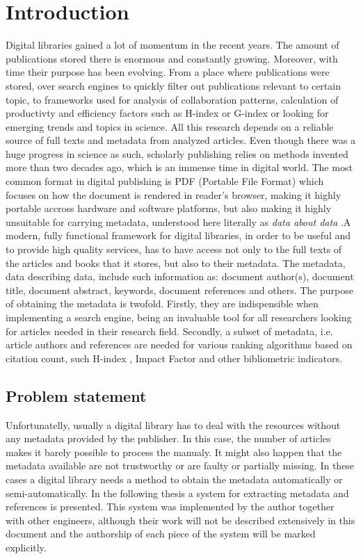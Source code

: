 \chapter{Introduction}
Digital libraries gained a lot of momentum in the recent years. The amount of publications stored there is enormous and constantly growing. Moreover, with time their purpose has been evolving. From a place where publications were stored, over search engines to quickly filter out publications relevant to certain topic, to frameworks used for analysis of collaboration patterns, calculation of productivty and efficiency factors such as H-index or G-index or looking for emerging trends and topics in science. All this research depends on a reliable source of full texts and metadata from analyzed articles.
Even though there was a huge progress in science as such, scholarly publishing relies on methods invented more than two decades ago, which is an immense time in digital world. The most common format in digital publishing is PDF (Portable File Format) which focuses on how the document is rendered in reader's browser, making it highly portable accross hardware and software platforms, but also making it highly unsuitable for carrying metadata, understood here literally as \textit{data about data}
.A modern, fully functional framework for digital libraries, in order to be useful and to provide high quality services, has to have access not only to the full texts of the articles and books that it stores, but also to their metadata. The metadata, data describing data, include such information as: document author(s), document title, document abstract, keywords, document references and others. The purpose of obtaining the metadata is twofold. Firstly, they are indispensible when implementing a search engine, being an invaluable tool for all researchers looking for articles needed in their research field. Secondly, a subset of metadata, i.e. article authors and references are needed for various ranking algorithms based on citation count, such H-index \cite{Hirsch2005}, Impact Factor and other bibliometric indicators.
\section{Problem statement}
Unfortunatelly, usually a digital library has to deal with the resources without any metadata provided by the publisher. In this case, the number of articles makes it barely possible to process the manualy. It might also happen that the metadata available are not trustworthy or are faulty or partially missing. In these cases a digital library needs a method to obtain the metadata automatically or semi-automatically. In the following thesis a system for extracting metadata and references is presented. This system was implemented by the author together with other engineers, although their work will not be described extensively in this document and the authorship of each piece of the system will be marked explicitly. 
